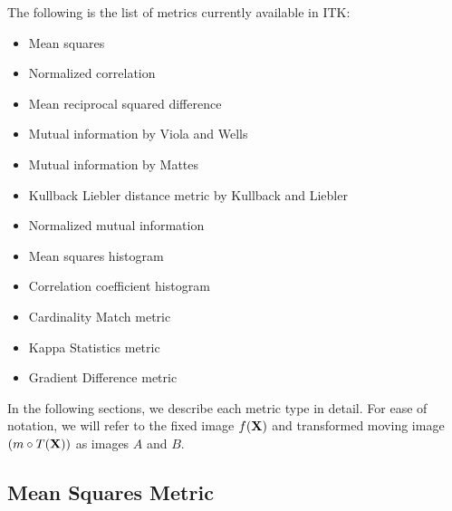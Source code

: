 The following is the list of metrics currently available in ITK:
\begin{itemize}
\item Mean squares\\ 
\item Normalized correlation \\ 
\item Mean reciprocal squared difference \\  
\item Mutual information by Viola and Wells \\ 
\item Mutual information by Mattes \\ 
\item Kullback Liebler distance metric by Kullback and Liebler \\ 
\item Normalized mutual information \\ 
\item Mean squares histogram \\ 
\item Correlation coefficient histogram \\ 
\item Cardinality Match metric \\ 
\item Kappa Statistics metric\\ 
\item Gradient Difference metric \\ 
\end{itemize}

In the following sections, we describe each metric type in detail. 
For ease of notation, we will refer to the fixed image $f(\bf{X})$ 
and transformed moving image $(m \circ T(\bf{X}))$ as images $A$ and $B$.

\subsection{Mean Squares Metric}
\label{sec:MeanSquaresMetric}

